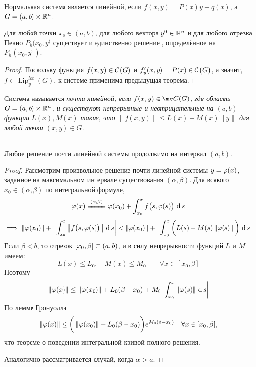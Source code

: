 \begin{restate}
	Нормальная система является линейной, если $ f(x, y) = P(x)y + q(x) $, а $ G = (a, b) \times \R^n $.
\end{restate}

\begin{theorem}
    Для любой точки $ x_0 \in (a, b) $, для любого вектора $ y^0 \in \R^n $ и для любого отрезка Пеано $ P_h(x_0, y^) $ существует и единственно решение , определённое на $ P_h(x_0, y^0) $.
\end{theorem}

\begin{proof}
    Поскольку функция $ f(x, y) \in \Cont G $ и $ f_y'(x, y) = P(x) \in \Cont G $, а значит, $ f \in \operatorname{Lip}_y^{loc}(G) $, к системе  применима предыдущая теорема.
\end{proof}

\begin{definition}
    Система  называется \it{почти линейной}, если $ f(x, y) \in \mc C(G) $, где область $ G = (a, b) \times \R^n $, и существуют непрерывные и неотрицательные на $ (a, b) $ функции $ L(x), M(x) $ такие, что $ \| f(x, y) \| \le L(x) + M(x) \| y \| $ для любой точки $ (x, y) \in G $.
\end{definition}

\begin{theorem}
    \hfill \\
	Любое решение почти линейной системы продолжимо на интервал $ (a, b) $.
\end{theorem}

\begin{proof}
    Рассмотрим произвольное решение почти линейной системы $ y = \vphi(x) $, заданное на максимальном интервале существования $ (\alpha, \beta) $. Для всякого $ x_0 \in (\alpha, \beta) $ по интегральной формуле,
    $$ \vphi(x) \equiv[(\alpha, \beta)] \vphi(x_0) + \dint[s]{x_0}x{f \big( s, \vphi(s) \big)} $$
    $$ \implies \norm{\vphi(x_0)} + \bigg| \dint[s]{x_0}x{\norm{f \big( s, \vphi(s) \big)}} \bigg| < \norm{\vphi(x_0)} + \bigg| \dint[s]{x_0}x{\bigg( L(s) + M(s) \norm{\vphi(s)} \bigg)} \bigg| $$
    Если $ \beta < b $, то отрезок $ [x_0, \beta] \sub (a, b) $, и в силу непрерывности функций $ L $ и $ M $ имеем:
    $$ L(x) \le L_0, \quad M(x) \le M_0 \qquad \forall x \in [x_0, \beta] $$
    Поэтому
    $$ \norm{\vphi(x)} \le \norm{\vphi(x_0)} + L_0(\beta - x_0) + M_0 \bigg| \dint[s]{x_0}x{\norm{\vphi(s)}} \bigg| $$
    По лемме Гронуолла
    $$ \norm{\vphi(x)} \le \bigg( \norm{\vphi(x_0)} + L_0(\beta - x_0) \bigg)e^{M_0(\beta - x_0)} \quad \forall x \in [x_0, \beta], $$
    что  теореме о поведении интегральной кривой полного решения.

    Аналогично рассматривается случай, когда $ \alpha > a $.
\end{proof}

